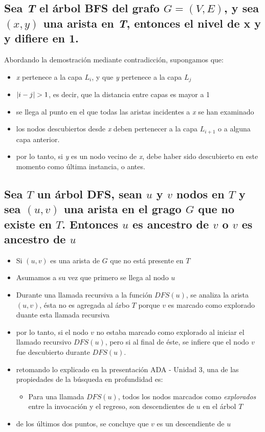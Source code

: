 \documentclass[letterpaper, 12pt]{article}
\begin{document}
\subsection{Sea \emph{T} el árbol BFS del grafo \(G=(V, E)\), y sea \((x, y)\) una arista en \emph{T}, entonces el nivel de x y y difiere en 1.}
\label{sec:orgdcd39f4}
Abordando la demostración mediante contradicción, supongamos que:
\begin{itemize}
\item \emph{x} pertenece a la capa \(L_i\), y que \emph{y} pertenece a la capa \(L_j\)
\item \(\abs{i - j} > 1\), es decir, que la distancia entre capas es mayor a 1
\item se llega al punto en el que todas las aristas incidentes a \emph{x} se han examinado
\item los nodos descubiertos desde \emph{x} deben pertenecer a la capa \(L_{i+1}\) o a
alguna capa anterior.
\item por lo tanto, si \emph{y} es un nodo vecino de \emph{x}, debe haber sido descubierto en
este momento como última instancia, o antes.
\end{itemize}
\subsection{Sea \(T\) un árbol DFS, sean \(u\) y \(v\) nodos en \(T\) y sea \((u, v)\) una arista en el grago \(G\) que no existe en \(T\). Entonces \(u\) es ancestro de \(v\) o \(v\) es ancestro de \(u\)}
\label{sec:org81c4307}
\begin{itemize}
\item Si \((u, v)\) es una arista de \(G\) que no está presente en \(T\)
\item Asumamos a su vez que primero se llega al nodo \(u\)
\item Durante una llamada recursiva a la función \(DFS(u)\), se analiza la arista
\((u, v)\), ésta no es agregada al árbo \(T\) porque \(v\) es marcado como
\guillemotleft{}explorado\guillemotright{} duante esta llamada recursiva
\item por lo tanto, si el nodo \(v\) no estaba marcado como \guillemotleft{}explorado\guillemotright{} al iniciar el
llamado recursivo \(DFS(u)\), pero si al final de éste, se infiere que el nodo \(v\) fue descubierto durante \(DFS(u)\).
\item retomando lo explicado en la presentación \guillemotleft{}ADA - Unidad 3\guillemotright{}, una de las
propiedades de la búsqueda en profundidad es:
\begin{itemize}
\item \guillemotleft{}Para una llamada \(DFS(u)\), todos los nodos marcados como \emph{explorados} entre
la invocación y el regreso, son  descendientes de \(u\) en el árbol \(T\)\guillemotright{}
\end{itemize}
\item de los últimos dos puntos, se concluye que \(v\) es un descendiente de \(u\)
\end{itemize}
\end{document}
